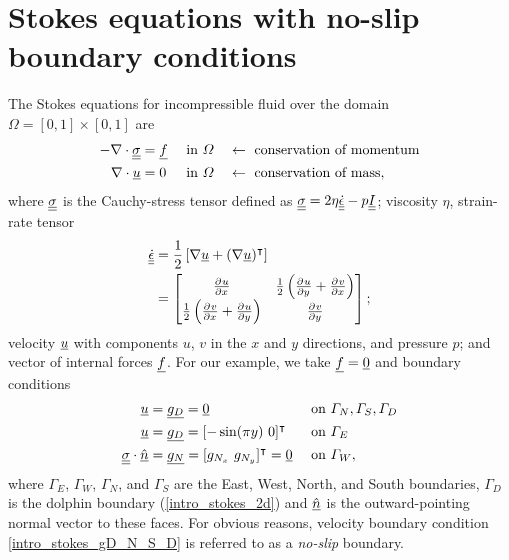 \section{Stokes equations with no-slip boundary conditions} \label{ssn_intro_stokes_2d}

The Stokes equations for incompressible fluid over the domain $\Omega = [0,1] \times [0,1]$ are
\begin{align}
  \label{intro_stokes_momentum}
  -\nabla \cdot \underline{\underline{\sigma}} &= \underline{f} &&\text{ in } \varOmega &&\leftarrow \text{ conservation of momentum} \\
  \label{intro_stokes_mass}
  \nabla \cdot \underline{u} &= 0 &&\text{ in } \varOmega &&\leftarrow \text{ conservation of mass},
\end{align}
where $\underline{\underline{\sigma}}$ is the Cauchy-stress tensor defined as $\underline{\underline{\sigma}} = 2\eta \underline{\underline{\dot{\epsilon}}} - p\underline{\underline{I}}$; viscosity $\eta$, strain-rate tensor
\begin{align}
  \label{intro_strain_rate_tensor}
  \underline{\underline{\dot{\epsilon}}} &= \frac{1}{2}\left[\nabla \underline{u} + (\nabla \underline{u})^\intercal \right] \notag \\
  &= \begin{bmatrix}
       \frac{\partial{^{}} u}{\partial x{^{}} } & \frac{1}{2} \left( \frac{\partial{^{}} u}{\partial y{^{}} } + \frac{\partial{^{}} v}{\partial x{^{}} } \right) \\
       \frac{1}{2} \left( \frac{\partial{^{}} v}{\partial x{^{}} } + \frac{\partial{^{}} u}{\partial y{^{}} } \right) & \frac{\partial{^{}} v}{\partial y{^{}} }
     \end{bmatrix};
\end{align}
velocity $\underline{u}$ with components $u$, $v$ in the $x$ and $y$ directions, and pressure $p$; and vector of internal forces $\underline{f}$.  For our example, we take $\underline{f}=\underline{0}$ and boundary conditions
\begin{align}
  \label{intro_stokes_gD_N_S_D}
  \rankone{u} &= \rankone{g_D} = \rankone{0} &&\text{ on } \Gamma_N, \Gamma_S, \Gamma_D \\
  \label{intro_stokes_gD_E}
  \rankone{u} &= \rankone{g_D} = [-\sin(\pi y)\ 0]\T &&\text{ on } \Gamma_E \\
  \label{intro_stokes_gN}
  \ranktwo{\sigma} \cdot \normal &= \rankone{g_N} = [g_{N_x}\ g_{N_y}]\T = \rankone{0} &&\text{ on } \Gamma_W,
\end{align}
where $\Gamma_E$, $\Gamma_W$, $\Gamma_N$, and $\Gamma_S$ are the East, West, North, and South boundaries, $\Gamma_D$ is the dolphin boundary (\cref{intro_stokes_2d}) and $\underline{\hat{n}}$ is the outward-pointing normal vector to these faces. For obvious reasons, velocity boundary condition \cref{intro_stokes_gD_N_S_D} is referred to as a \emph{no-slip} boundary.

